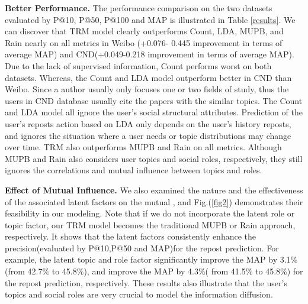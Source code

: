 \documentclass[runningheads,a4paper]{llncs}
\begin{document}
\textbf{Better Performance.} The performance comparison on the two datasets evaluated by P@10, P@50, P@100 and MAP is illustrated in Table \ref{results}. We can discover that TRM model clearly outperforms Count, LDA, MUPB, and Rain nearly on all metrics in Weibo (+0.076- 0.445 improvement in terms of average MAP) and CND(+0.049-0.218 improvement in terms of average MAP). Due to the lack of supervised information, Count performs worst on both datasets. Whereas, the Count and LDA model outperform better in CND than Weibo. Since a author usually only focuses one or two  fields of study, thus the users in CND database usually cite the papers with the similar topics. The Count and LDA model all ignore the user's social structural attributes. Prediction of the user's reposts action based on LDA only depends on the user's history reposts, and ignores the situation where a user needs or topic distributions may change over time. TRM also outperforms MUPB and Rain on all metrics. Although MUPB and Rain also considers user topics and social roles, respectively, they still ignores the correlations and mutual influence between topics and roles.




\noindent\textbf{Effect of Mutual Influence.} We also examined the nature and the effectiveness of the associated latent factors on the mutual , and Fig.(\ref{fig2}) demonstrates their feasibility in our modeling. Note that if we do not incorporate the latent role or topic factor, our TRM model becomes the traditional MUPB or Rain approach, respectively. It shows that the latent factors consistently enhance the precision(evaluated by P@10,P@50 and MAP)for the repost prediction. For example, the latent topic and role factor significantly improve the MAP by 3.1\%(from 42.7\% to 45.8\%), and improve the MAP by 4.3\%( from 41.5\% to 45.8\%) for the repost prediction, respectively. These results also illustrate that the user's topics and social roles are very crucial to model the information diffusion.
\end{document}
